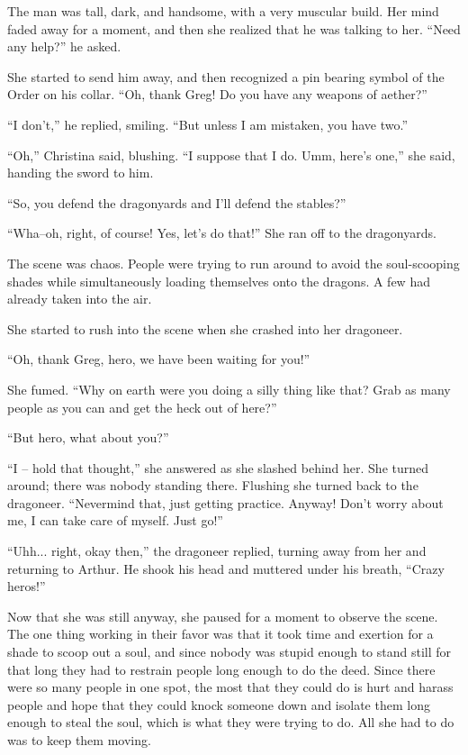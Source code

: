 \documentclass[showtrims,b6paper,draft,10pt]{memoir}
\begin{document}
The man was tall, dark, and handsome, with a very muscular build.  Her mind faded away for a moment, and then she realized that he was talking to her.  ``Need any help?''  he asked.

She started to send him away, and then recognized a pin bearing symbol of the Order on his collar.  ``Oh, thank Greg!  Do you have any weapons of aether?''

``I don't,'' he replied, smiling.  ``But unless I am mistaken, you have two.''

``Oh,'' Christina said, blushing.  ``I suppose that I do.  Umm, here's one,'' she said, handing the sword to him.

``So, you defend the dragonyards and I'll defend the stables?''

``Wha--oh, right, of course!  Yes, let's do that!''  She ran off to the dragonyards.

\timeskip
The scene was chaos.  People were trying to run around to avoid the soul-scooping shades while simultaneously loading themselves onto the dragons.  A few had already taken into the air.

She started to rush into the scene when she crashed into her dragoneer.

``Oh, thank Greg, hero, we have been waiting for you!''

She fumed.  ``Why on earth were you doing a silly thing like that?  Grab as many people as you can and get the heck out of here?''

``But hero, what about you?''

``I -- hold that thought,'' she answered as she slashed behind her.  She turned around;  there was nobody standing there.  Flushing she turned back to the dragoneer.  ``Nevermind that, just getting practice.  Anyway!  Don't worry about me, I can take care of myself.  Just go!''

``Uhh... right, okay then,'' the dragoneer replied, turning away from her and returning to Arthur.  He shook his head and muttered under his breath, ``Crazy heros!''

Now that she was still anyway, she paused for a moment to observe the scene.  The one thing working in their favor was that it took time and exertion for a shade to scoop out a soul, and since nobody was stupid enough to stand still for that long they had to restrain people long enough to do the deed.  Since there were so many people in one spot, the most that they could do is hurt and harass people and hope that they could knock someone down and isolate them long enough to steal the soul, which is what they were trying to do.  All she had to do was to keep them moving.
\end{document}

